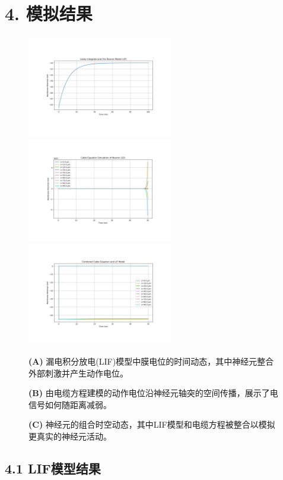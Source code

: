 \documentclass[12pt]{article}
\begin{document}
\section*{4. 模拟结果}
\begin{figure}[h]
\includegraphics[width=2.5in]{image1.pdf} \includegraphics[width=2.5in] {image2.pdf} \includegraphics[width=2.5in]{image3.pdf}
\caption{{\bf (A)} 漏电积分放电(LIF)模型中膜电位的时间动态，其中神经元整合外部刺激并产生动作电位。}
\caption{{\bf (B)} 由电缆方程建模的动作电位沿神经元轴突的空间传播，展示了电信号如何随距离减弱。}
\caption{{\bf (C)} 神经元的组合时空动态，其中LIF模型和电缆方程被整合以模拟更真实的神经元活动。}
\end{figure}
\subsection*{4.1 LIF模型结果}
\end{document}

